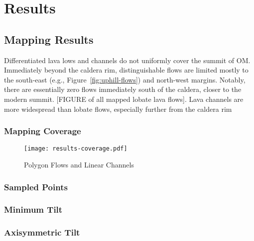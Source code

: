 \chapter{Results}

\section{Mapping Results}

Differentiated lava lows and channels do not uniformly cover the summit of \acf{OM}. Immediately beyond the caldera rim, distinguishable flows are limited mostly to the south-east (e.g., Figure~\ref{fig:uphill-flows}) and north-west margins. Notably, there are essentially zero flows immediately south of the caldera, closer to the modern summit. [FIGURE of all mapped lobate lava flows]. Lava channels are more widespread than lobate flows, especially further from the caldera rim 

\subsection{Mapping Coverage}
\begin{figure}
    \texttt{[image: results-coverage.pdf]}%
    \caption[Mapping Coverage]{Polygon Flows and Linear Channels}%
    \label{fig:results-coverage}
\end{figure}
\subsection{Sampled Points}
\subsection{Minimum Tilt}
\subsection{Axisymmetric Tilt}


